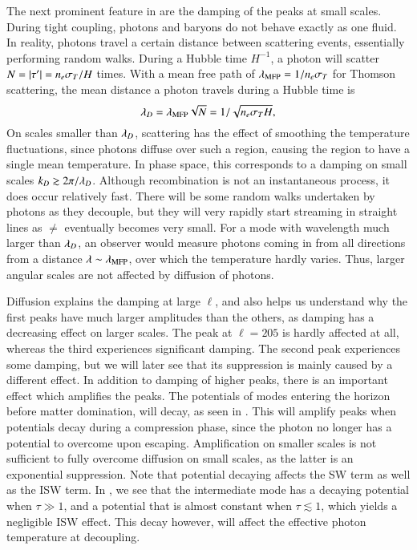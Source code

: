 The next prominent feature in  are the damping of the peaks at small scales. During tight coupling, photons and baryons do not behave exactly as one fluid. In reality, photons travel a certain distance between scattering events, essentially performing random walks. During a Hubble time $H^{-1}$, a photon will scatter $N=\abs{\tau'}=n_e \sigma_T / H$ times. With a mean free path of $\lambda_\mathrm{MFP}=1/n_e \sigma_T$ for Thomson scattering, the mean distance a photon travels during a Hubble time is 
\begin{equation}
    \lambda_D = \lambda_\mathrm{MFP} \sqrt{N} = 1 / \sqrt{n_e \sigma_T H},
\end{equation}
On scales smaller than $\lambda_D$, scattering has the effect of smoothing the temperature fluctuations, since photons diffuse over such a region, causing the region to have a single mean temperature. In phase space, this corresponds to a damping on small scales $k_D\gtrsim 2\pi/\lambda_D$. Although recombination is not an instantaneous process, it does occur relatively fast. There will be some random walks undertaken by photons as they decouple, but they will very rapidly start streaming in straight lines as $\ne$ eventually becomes very small. For a mode with wavelength much larger than $\lambda_D$, an observer would measure photons coming in from all directions from a distance $\lambda\sim\lambda_\mathrm{MFP}$, over which the temperature hardly varies. Thus, larger angular scales are not affected by diffusion of photons. 

Diffusion explains the damping at large $\ell$, and also helps us understand why the first peaks have much larger amplitudes than the others, as damping has a decreasing effect on larger scales. The peak at $\ell=205$ is hardly affected at all, whereas the third experiences significant damping. The second peak experiences some damping, but we will later see that its suppression is mainly caused by a different effect. In addition to damping of higher peaks, there is an important effect which amplifies the peaks. The potentials of modes entering the horizon before matter domination, will decay, as seen in . This will amplify peaks when potentials decay during a compression phase, since the photon no longer has a potential to overcome upon escaping. Amplification on smaller scales is not sufficient to fully overcome diffusion on small scales, as the latter is an exponential suppression. Note that potential decaying affects the SW term as well as the ISW term. In , we see that the intermediate mode has a decaying potential when $\tau\gg1$, and a potential that is almost constant when $\tau\lesssim1$, which yields a negligible ISW effect. This decay however, will affect the effective photon temperature at decoupling.    

